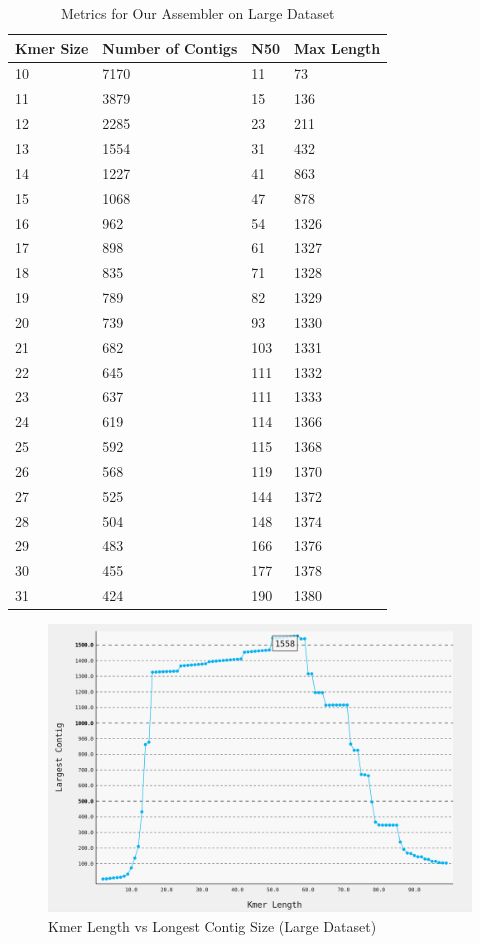 \documentclass[12pt]{article}
\begin{document}
\begin{table}[p]
\centering
\begin{tabular}{|l|l|l|l|} \hline
Kmer Size &Number of Contigs &N50 &Max Length\\\hline
10 & 7170 & 11 & 73 \\
11 & 3879 & 15 & 136 \\
12 & 2285 & 23 & 211 \\
13 & 1554 & 31 & 432 \\
14 & 1227 & 41 & 863 \\
15 & 1068 & 47 & 878 \\
16 & 962 & 54 & 1326 \\
17 & 898 & 61 & 1327 \\
18 & 835 & 71 & 1328 \\
19 & 789 & 82 & 1329 \\
20 & 739 & 93 & 1330 \\
21 & 682 & 103 & 1331 \\
22 & 645 & 111 & 1332 \\
23 & 637 & 111 & 1333 \\
24 & 619 & 114 & 1366 \\
25 & 592 & 115 & 1368 \\
26 & 568 & 119 & 1370 \\
27 & 525 & 144 & 1372 \\
28 & 504 & 148 & 1374 \\
29 & 483 & 166 & 1376 \\
30 & 455 & 177 & 1378 \\
31 & 424 & 190 & 1380 \\ \hline
\end{tabular}
\caption{Metrics for Our Assembler on Large Dataset}
\label{table:kens}
\end{table}

\begin{figure}[p]
\centering
\includegraphics[width=5.5in]{klen_vs_largestcontig_large_fasta.png}
\caption{Kmer Length vs Longest Contig Size (Large Dataset)}
\label{fig:kmer_to_contig_large}
\end{figure}
\end{document}
